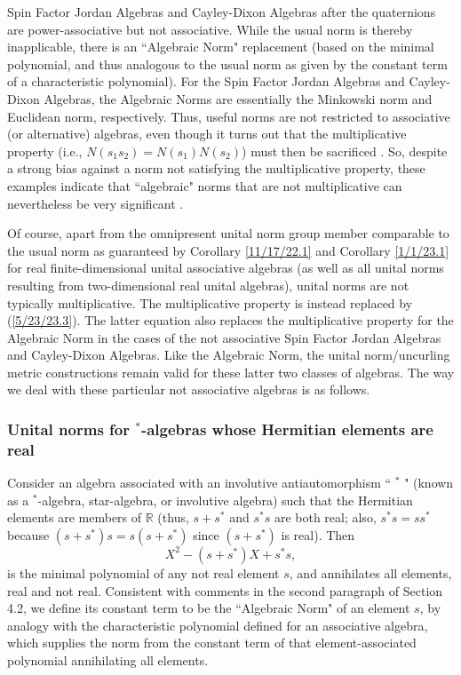 \documentclass{amsart}
\numberwithin{equation}{section}
\theoremstyle{definition}
\numberwithin{theorem}{section}
\begin{document}
Spin Factor Jordan Algebras and Cayley-Dixon Algebras after the quaternions are power-associative but not associative.  While the usual norm is thereby inapplicable, there is an ``Algebraic Norm" replacement \cite{jacobson:1963} (based on the minimal polynomial, and thus analogous to the usual norm as given by the constant term of a characteristic polynomial).  For the Spin Factor Jordan Algebras and Cayley-Dixon Algebras, the Algebraic Norms are essentially the  Minkowski  norm and Euclidean norm, respectively.  Thus, useful norms are not restricted to associative (or alternative) algebras, even though it turns out that the multiplicative property (i.e., $N(s_1s_2)=N(s_1)N(s_2)$) must then be sacrificed  \cite{schafer:1963}. 
So, despite a strong bias against a norm not satisfying the multiplicative property, these examples indicate that ``algebraic" norms that are not multiplicative can nevertheless be very significant \cite{mccrimmon:2004}. 

Of course, apart from the omnipresent unital norm group member comparable to the usual norm as guaranteed by Corollary \ref{11/17/22.1} and Corollary \ref{1/1/23.1} for real finite-dimensional unital associative algebras (as well as all unital norms resulting from two-dimensional real unital algebras), unital norms are not typically multiplicative.  The multiplicative property is instead replaced by (\ref{5/23/23.3}).  The latter equation also replaces the multiplicative property for the Algebraic Norm in the cases of the not associative Spin Factor Jordan Algebras and Cayley-Dixon Algebras. 
Like the Algebraic Norm, the unital norm/uncurling metric constructions remain valid for these latter two classes of algebras.  The way we deal with these particular not associative algebras is as follows.

\subsubsection{Unital norms for $^*$-algebras whose Hermitian elements are real} 

Consider an algebra associated with an involutive antiautomorphism ``
$^*$ " (known as a $^*$-algebra, star-algebra, or involutive algebra) such that the Hermitian elements are members of $\mathbb{R}$ (thus, $s+s^*$ and $s^*s$ are both real; also, $s^*s = ss^*$ because $(s+s^*)s = s(s+s^*)$ since $(s+s^*)$ is real). 
Then \[ X^2 - (s+s^*)X + s^*s, \] is the minimal polynomial of any not real element $s$, and annihilates all elements, real and not real.  Consistent with comments in the second paragraph of Section 4.2, we define its constant term to be the ``Algebraic Norm" of an element $s$, by analogy with the characteristic polynomial defined for an associative algebra, which supplies the norm from the constant term of that element-associated polynomial annihilating all elements.
\end{document}
